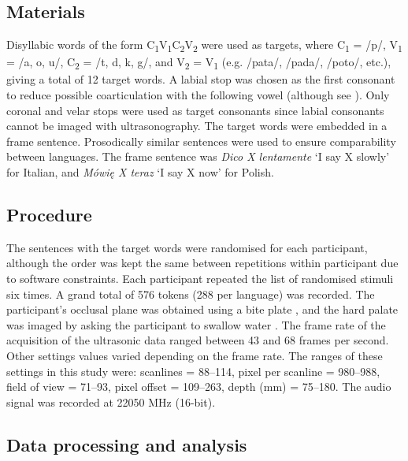 \documentclass[authoryear, 5p]{elsarticle}
\begin{document}
\subsection{Materials}\label{materials}

Disyllabic words of the form
C\textsubscript{1}V\textsubscript{1}C\textsubscript{2}V\textsubscript{2}
were used as targets, where C\textsubscript{1} = /p/, V\textsubscript{1}
= /a, o, u/, C\textsubscript{2} = /t, d, k, g/, and V\textsubscript{2} =
V\textsubscript{1} (e.g. /pata/, /pada/, /poto/, etc.), giving a total
of 12 target words. A labial stop was chosen as the first consonant to
reduce possible coarticulation with the following vowel (although see
\citealt{vazquez-alvarez2007}). Only coronal and velar stops were used
as target consonants since labial consonants cannot be imaged with
ultrasonography. The target words were embedded in a frame sentence.
Prosodically similar sentences were used to ensure comparability between
languages. The frame sentence was \emph{Dico X lentamente} `I say X
slowly' for Italian, and \emph{Mówię X teraz} `I say X now' for Polish.

\subsection{Procedure}\label{procedure}

The sentences with the target words were randomised for each
participant, although the order was kept the same between repetitions
within participant due to software constraints. Each participant
repeated the list of randomised stimuli six times. A grand total of 576
tokens (288 per language) was recorded. The participant's occlusal plane
was obtained using a bite plate \citep{scobbie2011}, and the hard palate
was imaged by asking the participant to swallow water
\citep{epstein2005}. The frame rate of the acquisition of the ultrasonic
data ranged between 43 and 68 frames per second. Other settings values
varied depending on the frame rate. The ranges of these settings in this
study were: scanlines = 88--114, pixel per scanline = 980--988, field of
view = 71--93, pixel offset = 109--263, depth (mm) = 75--180. The audio
signal was recorded at 22050 MHz (16-bit).

\subsection{Data processing and
analysis}\label{data-processing-and-analysis}
\end{document}
